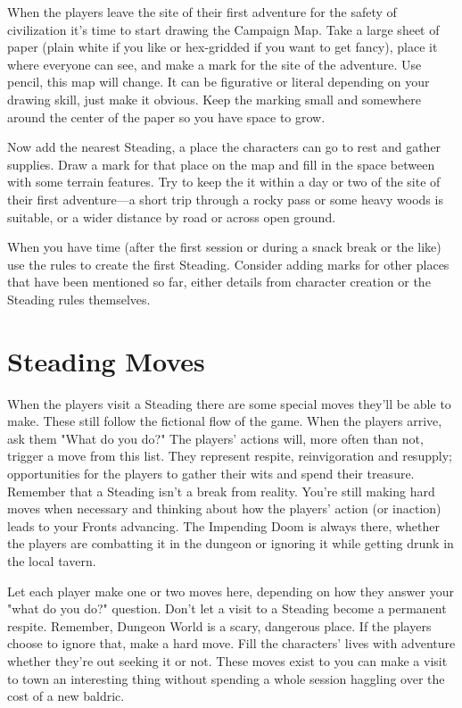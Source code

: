        

When the players leave the site of their first adventure for the safety of civilization it's time to start drawing the Campaign Map. Take a large sheet of paper (plain white if you like or hex-gridded if you want to get fancy), place it where everyone can see, and make a mark for the site of the adventure. Use pencil, this map will change. It can be figurative or literal depending on your drawing skill, just make it obvious. Keep the marking small and somewhere around the center of the paper so you have space to grow.

       

Now add the nearest Steading, a place the characters can go to rest and gather supplies. Draw a mark for that place on the map and fill in the space between with some terrain features. Try to keep the it within a day or two of the site of their first adventure—a short trip through a rocky pass or some heavy woods is suitable, or a wider distance by road or across open ground.

       

When you have time (after the first session or during a snack break or the like) use the rules to create the first Steading. Consider adding marks for other places that have been mentioned so far, either details from character creation or the Steading rules themselves.

       
\section{Steading Moves}   
       

When the players visit a Steading there are some special moves they'll be able to make. These still follow the fictional flow of the game. When the players arrive, ask them "What do you do?" The players' actions will, more often than not, trigger a move from this list. They represent respite, reinvigoration and resupply; opportunities for the players to gather their wits and spend their treasure. Remember that a Steading isn't a break from reality. You're still making hard moves when necessary and thinking about how the players' action (or inaction) leads to your Fronts advancing. The Impending Doom is always there, whether the players are combatting it in the dungeon or ignoring it while getting drunk in the local tavern.

       

Let each player make one or two moves here, depending on how they answer your "what do you do?" question. Don't let a visit to a Steading become a permanent respite. Remember, Dungeon World is a scary, dangerous place. If the players choose to ignore that, make a hard move. Fill the characters' lives with adventure whether they're out seeking it or not. These moves exist to you can make a visit to town an interesting thing without spending a whole session haggling over the cost of a new baldric.

